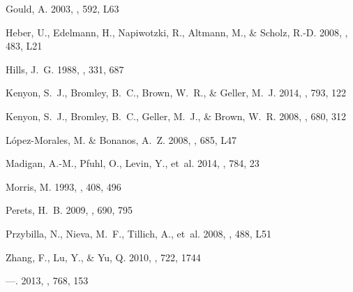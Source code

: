 \documentclass[iop]{emulateapj}
\begin{document}
\begin{thebibliography}{25}
{Gould}, A. 2003, \apjl, 592, L63

{Heber}, U., {Edelmann}, H., {Napiwotzki}, R., {Altmann}, M., \& {Scholz},
  R.-D. 2008, \aap, 483, L21

{Hills}, J.~G. 1988, \nat, 331, 687

{Kenyon}, S.~J., {Bromley}, B.~C., {Brown}, W.~R., \& {Geller}, M.~J. 2014,
  \apj, 793, 122

{Kenyon}, S.~J., {Bromley}, B.~C., {Geller}, M.~J., \& {Brown}, W.~R. 2008,
  \apj, 680, 312

{L{\'o}pez-Morales}, M. \& {Bonanos}, A.~Z. 2008, \apjl, 685, L47

{Madigan}, A.-M., {Pfuhl}, O., {Levin}, Y., {et~al.} 2014, \apj, 784, 23

{Morris}, M. 1993, \apj, 408, 496

{Perets}, H.~B. 2009, \apj, 690, 795

{Przybilla}, N., {Nieva}, M.~F., {Tillich}, A., {et~al.} 2008, \aap, 488, L51

{Zhang}, F., {Lu}, Y., \& {Yu}, Q. 2010, \apj, 722, 1744

---. 2013, \apj, 768, 153

\end{thebibliography}
\end{document}
